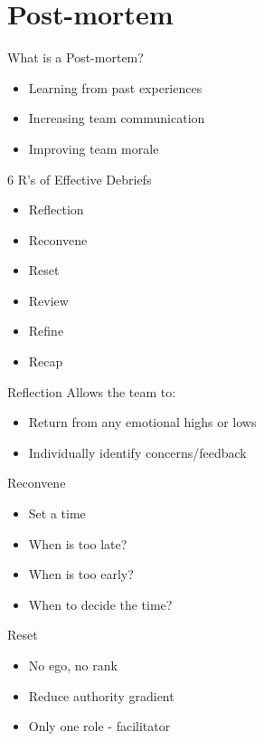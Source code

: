 \documentclass[aspectratio=169]{beamer}
\begin{document}
\section{Post-mortem}
\begin{frame}{What is a Post-mortem?}
    \begin{itemize}[<+->]
        \item Learning from past experiences
        \item Increasing team communication
        \item Improving team morale
    \end{itemize}
\end{frame}
\begin{frame}{6 R's of Effective Debriefs}
    \begin{itemize}[<+->]
        \item Reflection
        \item Reconvene
        \item Reset
        \item Review
        \item Refine
        \item Recap
    \end{itemize}
\end{frame}
\begin{frame}{Reflection}
    Allows the team to:
    \begin{itemize}
        \item Return from any emotional highs or lows
        \item Individually identify concerns/feedback
    \end{itemize}
\end{frame}
\begin{frame}{Reconvene}
    \begin{itemize}
        \item Set a time
        \item When is too late?
        \item When is too early?
        \item When to decide the time?
    \end{itemize}
\end{frame}
\begin{frame}{Reset}
    \begin{itemize}
        \item No ego, no rank
        \item Reduce authority gradient
        \item Only one role - facilitator
    \end{itemize}
\end{frame}
\end{document}
